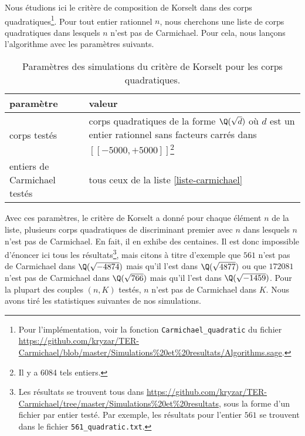 Nous étudions ici le critère de composition de Korselt \label{test-primalite-korselt} dans des corps quadratiques\footnote{Pour l'implémentation, voir la fonction \texttt{Carmichael\_quadratic} du fichier \url{https://github.com/kryzar/TER-Carmichael/blob/master/Simulations\%20et\%20resultats/Algorithms.sage}.}. Pour tout entier rationnel $n$, nous cherchons une liste de corps quadratiques dans lesquels $n$ n'est pas de Carmichael. Pour cela, nous lançons l'algorithme avec les paramètres suivants.

\begin{table}[H]\label{param-korselt-quadra}
	\begin{center}
		\begin{tabularx}{\textwidth}{|Y|Y|}
			\hline
			paramètre & valeur \\
			\hline
			\hline
			corps testés & corps quadratiques de la forme $\Q(\sqrt{d})$ où $d$ est un entier rationnel sans facteurs carrés dans $[\![-5000, +5000]\!]$\footnote{Il y a 6084 tels entiers.} \\\hline
			entiers de Carmichael testés & tous ceux de la liste \ref{liste-carmichael}  \\\hline
		\end{tabularx}
		\caption{Paramètres des simulations du critère de Korselt pour les corps quadratiques.}
	\end{center}
\end{table}

Avec ces paramètres, le critère de Korselt a donné pour chaque élément $n$ de la liste, plusieurs corps quadratiques de discriminant premier avec $n$ dans lesquels $n$ n'est pas de Carmichael. En fait, il en exhibe des centaines. Il est donc impossible d'énoncer ici tous les résultats\footnote{Les résultats se trouvent tous dans \url{https://github.com/kryzar/TER-Carmichael/tree/master/Simulations\%20et\%20resultats}, sous la forme d'un fichier par entier testé. Par exemple, les résultats pour l'entier $561$ se trouvent dans le fichier \texttt{561\_quadratic.txt}.}, mais citons à titre d'exemple que $561$ n'est pas de Carmichael dans $\Q(\sqrt{-4874})$ mais qu'il l'est dans $\Q(\sqrt{4877})$ ou que $172081$ n'est pas de Carmichael dans $\Q(\sqrt{766})$ mais qu'il l'est dans $\Q(\sqrt{-1459})$.  Pour la plupart des couples $(n, K)$ testés, $n$ n'est pas de Carmichael dans $K$. Nous avons tiré les statistiques suivantes de nos simulations.

